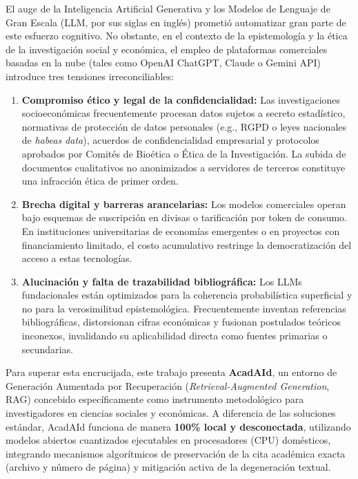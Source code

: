 \documentclass[12pt,a4paper]{article}
\begin{document}
El auge de la Inteligencia Artificial Generativa y los Modelos de Lenguaje de Gran Escala (LLM, por sus siglas en inglés) prometió automatizar gran parte de este esfuerzo cognitivo. No obstante, en el contexto de la epistemología y la ética de la investigación social y económica, el empleo de plataformas comerciales basadas en la nube (tales como OpenAI ChatGPT, Claude o Gemini API) introduce tres tensiones irreconciliables:

\begin{enumerate}[label=\alph*)]
    \item \textbf{Compromiso ético y legal de la confidencialidad:} Las investigaciones socioeconómicas frecuentemente procesan datos sujetos a secreto estadístico, normativas de protección de datos personales (e.g., RGPD o leyes nacionales de \textit{habeas data}), acuerdos de confidencialidad empresarial y protocolos aprobados por Comités de Bioética o Ética de la Investigación. La subida de documentos cualitativos no anonimizados a servidores de terceros constituye una infracción ética de primer orden.
    \item \textbf{Brecha digital y barreras arancelarias:} Los modelos comerciales operan bajo esquemas de suscripción en divisas o tarificación por token de consumo. En instituciones universitarias de economías emergentes o en proyectos con financiamiento limitado, el costo acumulativo restringe la democratización del acceso a estas tecnologías.
    \item \textbf{Alucinación y falta de trazabilidad bibliográfica:} Los LLMs fundacionales están optimizados para la coherencia probabilística superficial y no para la verosimilitud epistemológica. Frecuentemente inventan referencias bibliográficas, distorsionan cifras económicas y fusionan postulados teóricos inconexos, invalidando su aplicabilidad directa como fuentes primarias o secundarias.
\end{enumerate}

Para superar esta encrucijada, este trabajo presenta \textbf{AcadAId}, un entorno de Generación Aumentada por Recuperación (\textit{Retrieval-Augmented Generation}, RAG) concebido específicamente como instrumento metodológico para investigadores en ciencias sociales y económicas. A diferencia de las soluciones estándar, AcadAId funciona de manera \textbf{100\% local y desconectada}, utilizando modelos abiertos cuantizados ejecutables en procesadores (CPU) domésticos, integrando mecanismos algorítmicos de preservación de la cita académica exacta (archivo y número de página) y mitigación activa de la degeneración textual.
\end{document}
